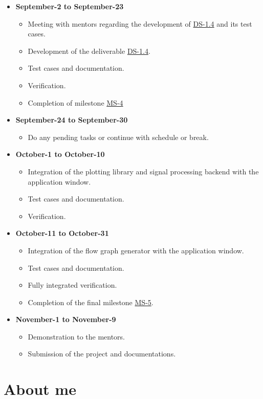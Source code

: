 \begin{itemize}
\begin{itemize}
	\end{itemize}
	\item \textbf{September-2 to September-23}
	\begin{itemize}
		\item Meeting with mentors regarding the development of \hyperref[sec: deliverables]{DS-1.4} and its test cases.
		\item Development of the deliverable \hyperref[sec: deliverables]{DS-1.4}.
		\item Test cases and documentation.
		\item Verification.
		\item Completion of milestone \hyperref[sec: milestones]{MS-4}
	\end{itemize}
	\item \textbf{September-24 to September-30}
	\begin{itemize}
		\item Do any pending tasks or continue with schedule or 	break.
	\end{itemize}
	\item \textbf{October-1 to October-10}
	\begin{itemize}
		\item Integration of the plotting library and signal processing backend with the application window.
		\item Test cases and documentation.
		\item Verification.
	\end{itemize}
	\item \textbf{October-11 to October-31}
	\begin{itemize}
		\item Integration of the flow graph generator with the application window.
		\item Test cases and documentation.
		\item Fully integrated verification.
		\item Completion of the final milestone \hyperref[sec: milestones]{MS-5}.
	\end{itemize}
	\item \textbf{November-1 to November-9}
	\begin{itemize}
		\item Demonstration to the mentors.
		\item Submission of the project and documentations.
	\end{itemize} 
\end{itemize}


\section{About me}

